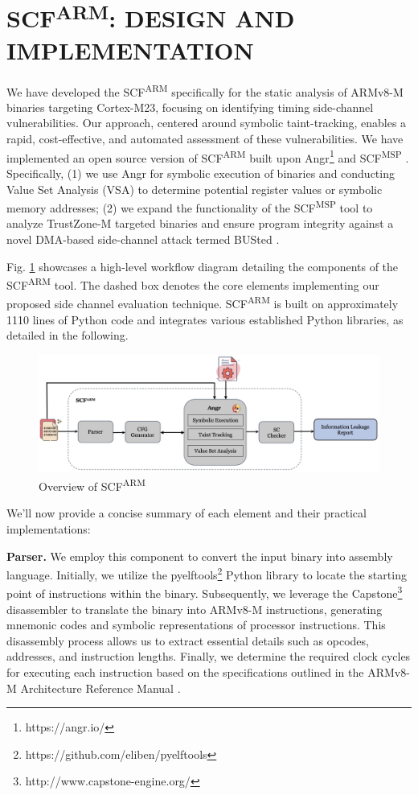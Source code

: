 \section{\ac{SCF}\textsuperscript{ARM}: DESIGN AND IMPLEMENTATION}

We have developed the \ac{SCF}\textsuperscript{ARM} specifically for the static analysis of ARMv8-M binaries targeting Cortex-M23, focusing on identifying timing side-channel vulnerabilities. Our approach, centered around symbolic taint-tracking, enables a rapid, cost-effective, and automated assessment of these vulnerabilities. We have implemented an open source  version of \ac{SCF}\textsuperscript{ARM} built upon Angr\footnote{https://angr.io/} and \ac{SCF}\textsuperscript{MSP} \cite{scfmsp}. Specifically, (1) we use Angr for symbolic execution of binaries and conducting Value Set Analysis (\ac{VSA}) to determine potential register values or symbolic memory addresses; (2) we expand the functionality of the \ac{SCF}\textsuperscript{MSP} tool to analyze TrustZone-M targeted binaries and ensure program integrity against a novel DMA-based side-channel attack termed BUSted \cite{busted}. 

Fig. \ref{fig:SCFARM} showcases a high-level workflow diagram detailing the components of the \ac{SCF}\textsuperscript{ARM} tool. The dashed box denotes the core elements implementing our proposed side channel evaluation technique. \ac{SCF}\textsuperscript{ARM} is built on approximately 1110 lines of Python code and integrates various established Python libraries, as detailed in the following.

\begin{figure}
  \centering
  \medskip
  \includegraphics[width=.9\textwidth]{figures/SCFARM.jpg}
  \caption[Short caption for Table of Figures]{Overview of \ac{SCF}\textsuperscript{ARM}}
  \label{fig:SCFARM}
\end{figure}

We'll now provide a concise summary of each element and their practical implementations:

\textbf{Parser.} We employ this component to convert the input binary into assembly language. Initially, we utilize the pyelftools\footnote{https://github.com/eliben/pyelftools} Python library to locate the starting point of instructions within the binary. Subsequently, we leverage the Capstone\footnote{http://www.capstone-engine.org/} disassembler to translate the binary into ARMv8-M instructions, generating mnemonic codes and symbolic representations of processor instructions. This disassembly process allows us to extract essential details such as opcodes, addresses, and instruction lengths. Finally, we determine the required clock cycles for executing each instruction based on the specifications outlined in the ARMv8-M Architecture Reference Manual \cite{armv8m_ref_manual}.

